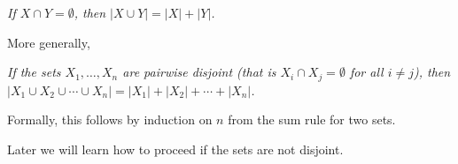 

\setcounter{section}{1}
\setcounter{subsection}{1}
\setcounter{dfn}{0}

\begin{center}
\emph{If $X \cap Y = \emptyset$, then $|X \cup Y| = |X| + |Y|$.}
\end{center}

More generally,
\begin{center}
\parbox{.9\textwidth}{\emph{If the sets $X_1, \ldots, X_n$ are pairwise disjoint
(that is $X_i \cap X_j = \emptyset$ for all $i \ne j$),
then $|X_1 \cup X_2 \cup \cdots \cup X_n| = |X_1| + |X_2| + \cdots + |X_n|$.}}
\end{center}
Formally, this follows by induction on $n$ from the sum rule for two sets.

Later we will learn how to proceed if the sets are not disjoint.



